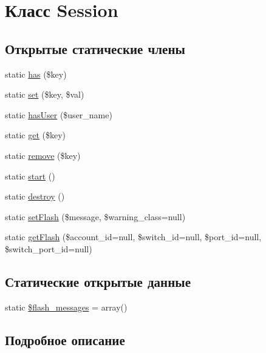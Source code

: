 \hypertarget{class_session}{\section{Класс Session}
\label{class_session}
}
\subsection*{Открытые статические члены}
\begin{DoxyCompactItemize}
\item 
static \hyperlink{class_session_a8f660283f72e0f3c5f00b4f98563a79b}{has} (\$key)
\item 
static \hyperlink{class_session_a4ecf4c33104949ba1a007a73d71dbb15}{set} (\$key, \$val)
\item 
static \hyperlink{class_session_a292b7d28cfcd001085631b11754a3a67}{has\-User} (\$user\-\_\-name)
\item 
static \hyperlink{class_session_a15e2679f2a8f6fa4d60757f4d65413ac}{get} (\$key)
\item 
static \hyperlink{class_session_acc60f64095c2df2c0d1e48f9f3ffb9d8}{remove} (\$key)
\item 
static \hyperlink{class_session_a146085d0f3a9d17bdcd7f3d4081d8c0d}{start} ()
\item 
static \hyperlink{class_session_a93d4348dfe017e3b97a7131f03897121}{destroy} ()
\item 
static \hyperlink{class_session_aa7c4da247e52be9a1eb10db617faba68}{set\-Flash} (\$message, \$warning\-\_\-class=null)
\item 
static \hyperlink{class_session_ae4c4b98671bdd1fbfe4ae9defb5405ad}{get\-Flash} (\$account\-\_\-id=null, \$switch\-\_\-id=null, \$port\-\_\-id=null, \$switch\-\_\-port\-\_\-id=null)
\end{DoxyCompactItemize}
\subsection*{Статические открытые данные}
\begin{DoxyCompactItemize}
\item 
static \hyperlink{class_session_a5bacf7bbae287dfd28fbaad90f463720}{\$flash\-\_\-messages} = array()
\end{DoxyCompactItemize}


\subsection{Подробное описание}


